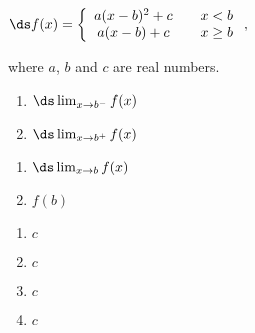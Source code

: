 {$\ds f(x) = \left\{\begin{array}{ccc}
	a(x-b)^2+c & & x<b \\
	a(x-b)+c & & x\geq b
	\end{array}
	\right.,
$

where $a$, $b$ and $c$ are real numbers.

\noindent\begin{minipage}[t]{.49\linewidth}
\begin{enumerate}
\item		$\ds \lim_{x\to b^-} f(x)$
\item		$\ds \lim_{x\to b^+} f(x)$
\end{enumerate}
\end{minipage}
\noindent\begin{minipage}[t]{.49\linewidth}
\begin{enumerate}\addtocounter{enumii}{2}
\item		$\ds \lim_{x\to b} f(x)$
\item		$f(b)$
\end{enumerate}
\end{minipage}
}
{\begin{enumerate}
\item		$c$
\item		$c$
\item		$c$
\item	  $c$
\end{enumerate}
}


